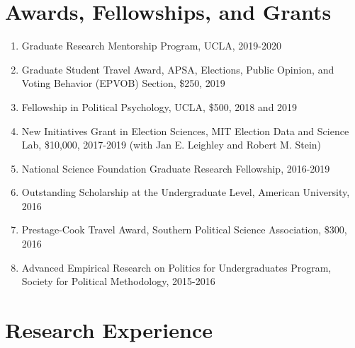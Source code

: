 \documentclass[12pt]{article}
\begin{document}
\section*{Awards, Fellowships, and Grants} 

\begin{enumerate}[topsep = 0pt, itemsep = 1ex, partopsep  = 1ex, parsep = 1ex]
	
	\item[] Graduate Research Mentorship Program, UCLA, 2019-2020
	
	\item[] Graduate Student Travel Award, APSA, Elections, Public Opinion, and Voting Behavior (EPVOB) Section, \$250, 2019
	
	\item[] Fellowship in Political Psychology, UCLA, \$500, 2018 and 2019
	
	\item[] New Initiatives Grant in Election Sciences, MIT Election Data and Science Lab, \$10,000, 2017-2019 (with Jan E. Leighley and Robert M. Stein)
	
	\item[] National Science Foundation Graduate Research Fellowship, 2016-2019
	
	\item[] Outstanding Scholarship at the Undergraduate Level, American University, 2016
	
	\item[] Prestage-Cook Travel Award, Southern Political Science Association, \$300, 2016
	
	\item[] Advanced Empirical Research on Politics for Undergraduates Program, Society for Political Methodology, 2015-2016
	
\end{enumerate}

\section*{Research Experience}
 
\end{document}
